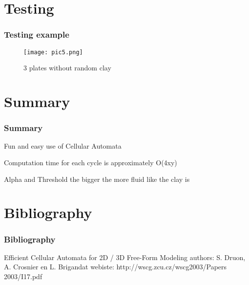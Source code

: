 \documentclass{beamer}
\begin{document}
\section{Testing}
\frame
{
	\frametitle{Testing example}
	\begin{figure}[htbp]
   \centering
   \texttt{[image: pic5.png]}
   \caption{3 plates without random clay}
   \label{Figure:figex}
	\end{figure}
}
\section{Summary}
\frame
{
	\frametitle{Summary}
	Fun and easy use of Cellular Automata 
	
	Computation time for each cycle is approximately O(4xy) 
	
	Alpha and Threshold the bigger the more fluid like the clay is 
}
\section{Bibliography}
\frame
{
	\frametitle{Bibliography}
	Efficient Cellular Automata for 2D / 3D Free-Form Modeling 
	authors: S. Druon, A. Crosnier en L. Brigandat 
	webiste: http://wscg.zcu.cz/wscg2003/Papers 2003/I17.pdf 
	
}
\end{document}
